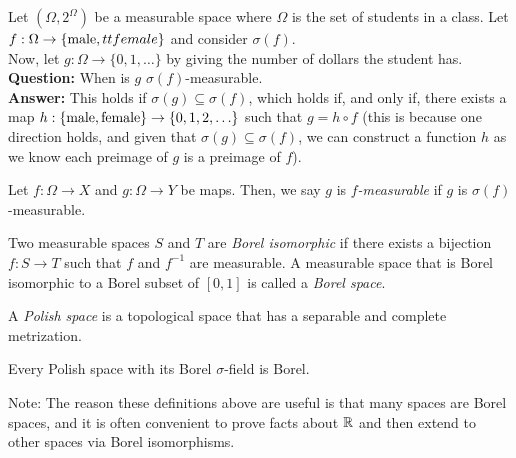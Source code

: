 
Let $(\Omega, 2^{\Omega})$ be a measurable space where $\Omega$ is the set of students in a class. Let $f : \Omega \to \{\tt{male}, tt{female}\}$ and consider $\sigma(f)$.\\

Now, let $g : \Omega \to \{0, 1, \ldots\}$ by giving the number of dollars the student has. \\

\textbf{Question:} When is $g$ $\sigma(f)$-measurable.\\

\textbf{Answer:} This holds if $\sigma(g) \subseteq \sigma(f)$, which holds if, and only if, there exists a map $h : \{\tt{male}, \tt{female}\} \to \{0, 1, 2, \ldots\}$ such that $g = h \circ f$ (this is because one direction holds, and given that $\sigma(g) \subseteq \sigma(f)$, we can construct a function $h$ as we know each preimage of $g$ is a preimage of $f$). \\

\begin{definition}
    Let $f : \Omega \to X$ and $g : \Omega \to Y$ be maps. Then, we say $g$ is \emph{$f$-measurable} if $g$ is $\sigma(f)$-measurable. 
\end{definition}

\begin{definition}
    Two measurable spaces $S$ and $T$ are \emph{Borel isomorphic} if there exists a bijection $f : S \to T$ such that $f$ and $f^{-1}$ are measurable. A measurable space that is Borel isomorphic to a Borel subset of $[0, 1]$ is called a \emph{Borel space}.
\end{definition}

\begin{definition}
    A \emph{Polish space} is a topological space that has a separable and complete metrization.
\end{definition}

\begin{lemma}
    Every Polish space with its Borel $\sigma$-field is Borel.
\end{lemma}

Note: The reason these definitions above are useful is that many spaces are Borel spaces, and it is often convenient to prove facts about $\R$ and then extend to other spaces via Borel isomorphisms.\\

